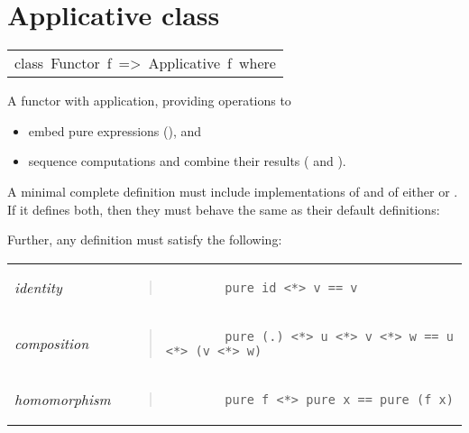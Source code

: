 \section{Applicative class
}
\begin{haddockdesc}
\item[\begin{tabular}{@{}l}
class\ Functor\ f\ =>\ Applicative\ f\ where
\end{tabular}]\haddockbegindoc
A functor with application, providing operations to\par
\begin{itemize}
\item
embed pure expressions (), and\par

\item
sequence computations and combine their results (\haddockid{<*>} and ).\par

\end{itemize}
A minimal complete definition must include implementations of 
 and of either \haddockid{<*>} or . If it defines both, then they must behave
 the same as their default definitions:\par
{}

\par
Further, any definition must satisfy the following:\par
\begin{tabular}{lp{8cm}}
\emph{identity}
      & \begin{quote}
        {\haddockverb\begin{verbatim}
        pure id <*> v == v\end{verbatim}}
        \end{quote} \\

\emph{composition}
      & \begin{quote}
        {\haddockverb\begin{verbatim}
        pure (.) <*> u <*> v <*> w == u <*> (v <*> w)\end{verbatim}}
        \end{quote} \\

\emph{homomorphism}
      & \begin{quote}
        {\haddockverb\begin{verbatim}
        pure f <*> pure x == pure (f x)\end{verbatim}}
        \end{quote} \\


\end{tabular}
\end{haddockdesc}
